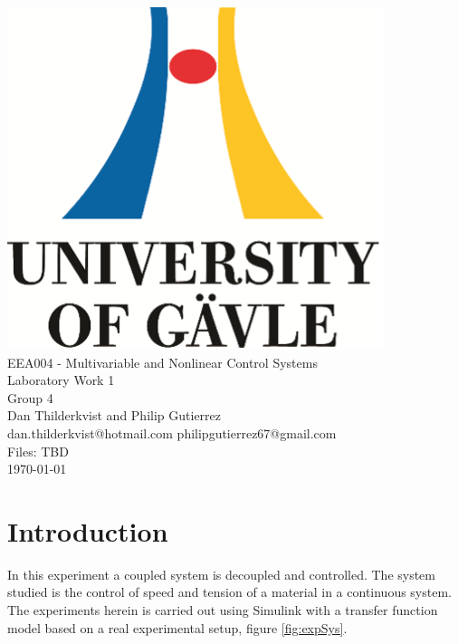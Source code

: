 \documentclass[a4paper, titlepage]{article}
\begin{document}

\begin{titlepage}
  \begin{center}
    \vspace*{1cm}
    \includegraphics[scale=1.0]{../figures/hig_logo_eng.png}\\
    \vspace{1.5cm}
    \large EEA004 - Multivariable and Nonlinear Control Systems\\
    \large Laboratory Work 1\\
    \vspace{1.5cm}
    Group 4\\
    Dan Thilderkvist and Philip Gutierrez\\
    dan.thilderkvist@hotmail.com philipgutierrez67@gmail.com\\
    Files: TBD\\
    \vspace{1cm}
    \today
  \end{center}
\end{titlepage}

\section{Introduction}
In this experiment a coupled system is decoupled and controlled.
The system studied is the control of speed and tension of a material in a continuous system.
The experiments herein is carried out using Simulink with a transfer function model based on a real experimental setup, figure \ref{fig:expSys}.
\end{document}

